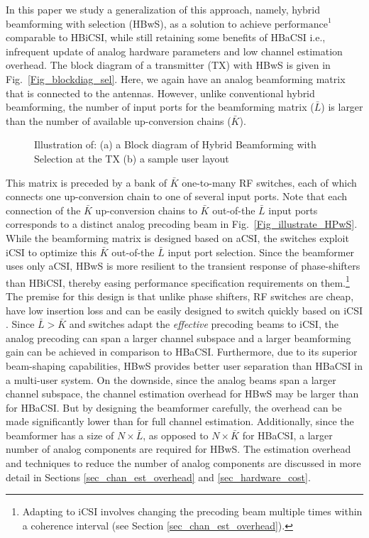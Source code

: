 \documentclass[journal,comsoc]{IEEEtran}
\begin{document}
In this paper we study a generalization of this approach, namely, hybrid beamforming with selection (HBwS), as a solution to achieve $\text{performance}^{1}$ comparable to HBiCSI, while still retaining some benefits of HBaCSI i.e., infrequent update of analog hardware parameters and low channel estimation overhead. 
The block diagram of a transmitter (TX) with HBwS is given in Fig.~\ref{Fig_blockdiag_sel}. Here, we again have an analog beamforming matrix that is connected to the antennas. However, unlike conventional hybrid beamforming, the number of input ports for the beamforming matrix ($\bar{L}$) is larger than the number of available up-conversion chains ($\bar{K}$). 
%
%
\begin{figure}[!h]
\centering
{} \hspace{5mm} 
\caption{Illustration of: (a) a Block diagram of Hybrid Beamforming with Selection at the TX (b) a sample user layout}
\label{Fig_Illustrate_HPwS}
\end{figure}
%
%
This matrix is preceded by a bank of $\bar{K}$ one-to-many RF switches, each of which connects one up-conversion chain to one of several input ports. Note that each connection of the $\bar{K}$ up-conversion chains to $\bar{K}$ out-of-the $\bar{L}$ input ports corresponds to a distinct analog precoding beam in Fig.~\ref{Fig_illustrate_HPwS}. 
While the beamforming matrix is designed based on aCSI, the switches exploit iCSI to optimize this $\bar{K}$ out-of-the $\bar{L}$ input port selection. 
%
Since the beamformer uses only aCSI, HBwS is more resilient to the transient response of phase-shifters \cite{Romanofsky2004} than HBiCSI, thereby easing performance specification requirements on them.\footnote{Adapting to iCSI involves changing the precoding beam multiple times within a coherence interval (see Section \ref{sec_chan_est_overhead}).} 
%
The premise for this design is that unlike phase shifters, RF switches are cheap, have low insertion loss and can be easily designed to switch quickly based on iCSI \cite{Rial2016, Sudarshan, Romanofsky2004, Yeh2017, Firouzjael2010, Schmid2014}.
Since $\bar{L} > \bar{K}$ and switches adapt the \emph{effective} precoding beams to iCSI, the analog precoding can span a larger channel subspace and a larger beamforming gain can be achieved in comparison to HBaCSI. 
%
Furthermore, due to its superior beam-shaping capabilities, HBwS provides better user separation than HBaCSI in a multi-user system. 
%
On the downside, since the analog beams span a larger channel subspace, the channel estimation overhead for HBwS may be larger than for HBaCSI. 
But by designing the beamformer carefully, the overhead can be made significantly lower than for full channel estimation. Additionally, since the beamformer has a size of $N \times \bar{L}$, as opposed to $N \times \bar{K}$ for HBaCSI, a larger number of analog components are required for HBwS. The estimation overhead and techniques to reduce the number of analog components are discussed in more detail in Sections \ref{sec_chan_est_overhead} and \ref{sec_hardware_cost}. 
%
\end{document}
